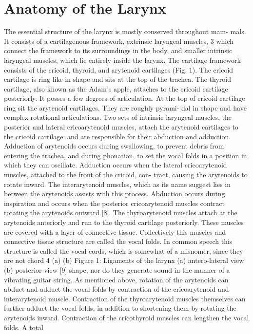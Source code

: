 \documentclass[12pt, letter]{report}
\begin{document}
\section{Anatomy of the Larynx}
The essential structure of the larynx is mostly conserved throughout mam-
mals. It consists of a cartilagenous framework, extrinsic laryngeal muscles,
3
which connect the framework to its surroundings in the body, and smaller
intrinsic laryngeal muscles, which lie entirely inside the larynx. The cartilage
framework consists of the cricoid, thyroid, and arytenoid cartilages (Fig. 1).
The cricoid cartilage is ring like in shape and sits at the top of the trachea.
The thyroid cartilage, also known as the Adam’s apple, attaches to the cricoid
cartilage posteriorly. It posses a few degrees of articulation. At the top of
cricoid cartilage ring sit the arytenoid cartilages. They are roughly pyrami-
dal in shape and have complex rotational articulations. Two sets of intrinsic
laryngeal muscles, the posterior and lateral cricoarytenoid muscles, attach
the arytenoid cartilages to the cricoid cartilage: and are responsible for their
abduction and adduction. Adduction of arytenoids occurs during swallowing,
to prevent debris from entering the trachea, and during phonation, to set the
vocal folds in a position in which they can oscillate. Adduction occurs when
the lateral cricoarytenoid muscles, attached to the front of the cricoid, con-
tract, causing the arytenoids to rotate inward. The interarytenoid muscles,
which as its name suggest lies in between the arytenoids assists with this
process. Abduction occurs during inspiration and occurs when the posterior
cricoarytenoid muscles contract rotating the arytenoids outward [8].
The thyroarytenoid muscles attach at the arytenoids anteriorly and run
to the thyroid cartilage posteriorly. These muscles are covered with a layer of
connective tissue. Collectively this muscles and connective tissue structure
are called the vocal folds. In common speech this structure is called the
vocal cords, which is somewhat of a misnomer, since they are not chord
4
(a)
 (b)
Figure 1: Ligaments of the larynx (a) antero-lateral view (b) posterior view
[9]
shape, nor do they generate sound in the manner of a vibrating guitar string.
As mentioned above, rotation of the arytenoids can abduct and adduct the
vocal folds by contraction of the cricoarytenoid and interarytenoid muscle.
Contraction of the thyroarytenoid muscles themselves can further adduct the
vocal folds, in addition to shortening them by rotating the arytenoids inward.
Contraction of the cricothyroid muscles can lengthen the vocal folds. A total
\end{document}
